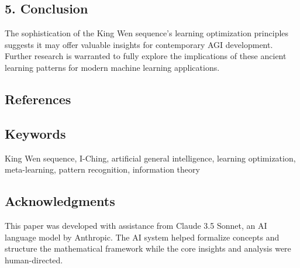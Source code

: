 \documentclass{article}
\begin{document}
\hypertarget{conclusion}{%
\subsection{5. Conclusion}\label{conclusion}}

The sophistication of the King Wen sequence's learning optimization
principles suggests it may offer valuable insights for contemporary AGI
development. Further research is warranted to fully explore the
implications of these ancient learning patterns for modern machine
learning applications.

\hypertarget{references}{%
\subsection{References}\label{references}}



\hypertarget{keywords}{%
\subsection{Keywords}\label{keywords}}

King Wen sequence, I-Ching, artificial general intelligence, learning
optimization, meta-learning, pattern recognition, information theory

\hypertarget{acknowledgments}{%
\subsection{Acknowledgments}\label{acknowledgments}}

This paper was developed with assistance from Claude 3.5 Sonnet, an AI
language model by Anthropic. The AI system helped formalize concepts and
structure the mathematical framework while the core insights and
analysis were human-directed.
\end{document}
